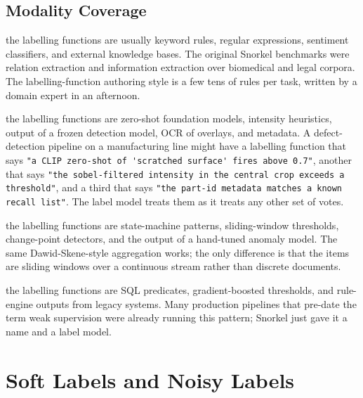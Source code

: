 \subsection{Modality Coverage}


 the labelling functions are usually keyword rules, regular expressions, sentiment classifiers, and external knowledge bases. The original Snorkel benchmarks were relation extraction and information extraction over biomedical and legal corpora. The labelling-function authoring style is a few tens of rules per task, written by a domain expert in an afternoon.

 the labelling functions are zero-shot foundation models, intensity heuristics, output of a frozen detection model, OCR of overlays, and metadata. A defect-detection pipeline on a manufacturing line might have a labelling function that says \verb|"a CLIP zero-shot of 'scratched surface' fires above 0.7"|, another that says \verb|"the sobel-filtered intensity in the central crop exceeds a threshold"|, and a third that says \verb|"the part-id metadata matches a known recall list"|. The label model treats them as it treats any other set of votes.

 the labelling functions are state-machine patterns, sliding-window thresholds, change-point detectors, and the output of a hand-tuned anomaly model. The same Dawid-Skene-style aggregation works; the only difference is that the items are sliding windows over a continuous stream rather than discrete documents.

 the labelling functions are SQL predicates, gradient-boosted thresholds, and rule-engine outputs from legacy systems. Many production pipelines that pre-date the term weak supervision were already running this pattern; Snorkel just gave it a name and a label model.


\newpage
\section{Soft Labels and Noisy Labels}


